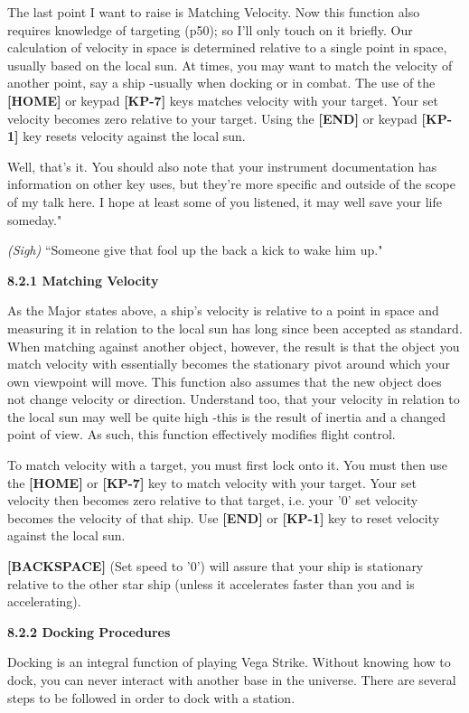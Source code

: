 \documentclass{article}
\begin{document}
The last point I want to raise is Matching Velocity. Now this function also requires knowledge of targeting (p50); so I'll only touch on it briefly. Our calculation of velocity in space is determined relative to a single point in space, usually based on the local sun. At times, you may want to match the velocity of another point, say a ship -usually when docking or in combat. The use of the \textbf{[HOME] }or keypad \textbf{[KP-7] }keys matches velocity with your target. Your set velocity becomes zero relative to your target. Using the \textbf{[END] }or keypad \textbf{[KP-1]} key resets velocity against the local sun. 

Well, that's it. You should also note that your instrument documentation has information on other key uses, but they're more specific and outside of the scope of my talk here. I hope at least some of you listened, it may well save your life someday." 

\textit{(Sigh) }``Someone give that fool up the back a kick to wake him up." 

\textbf{8.2.1 Matching Velocity }

As the Major states above, a ship's velocity is relative to a point in space and measuring it in relation to the local sun has long since been accepted as standard. When matching against another object, however, the result is that the object you match velocity with essentially becomes the stationary pivot around which your own viewpoint will move. This function also assumes that the new object does not change velocity or direction. Understand too, that your velocity in relation to the local sun may well be quite high -this is the result of inertia and a changed point of view. As such, this function effectively modifies flight control. 

To match velocity with a target, you must first lock onto it. You must then use the \textbf{[HOME] }or \textbf{[KP-7] }key to match velocity with your target. Your set velocity then becomes zero relative to that target, i.e. your '0' set velocity becomes the velocity of that ship. Use \textbf{[END]} or \textbf{[KP-1]} key to reset velocity against the local sun. 

\textbf{[BACKSPACE] }(Set speed to '0') will assure that your ship is stationary relative to the other star ship (unless it accelerates faster than you and is accelerating). 

\textbf{}

\textbf{8.2.2 Docking Procedures }

Docking is an integral function of playing Vega Strike. Without knowing how to dock, you can never interact with another base in the universe. There are several steps to be followed in order to dock with a station. 
\end{document}
